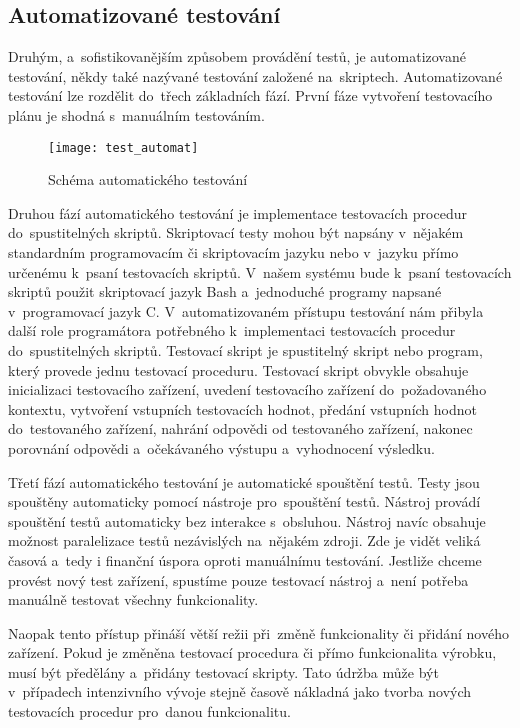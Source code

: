 \subsection{Automatizované testování}
Druhým, a~sofistikovanějším způsobem provádění testů, je automatizované testování, někdy také nazývané testování založené na~skriptech. Automatizované testování lze rozdělit do~třech základních fází. První fáze vytvoření testovacího plánu je shodná s~manuálním testováním.

\begin{figure}[h]
  \centering
  \texttt{[image: test\_automat]}
  \caption{Schéma automatického testování \cite{MBT} }
  \label{fig:test_automat}
\end{figure}

Druhou fází automatického testování je implementace testovacích procedur do~spustitelných skriptů. Skriptovací testy mohou být napsány v~nějakém standardním programovacím či skriptovacím jazyku nebo v~jazyku přímo určenému k~psaní testovacích skriptů. V~našem systému bude k~psaní testovacích skriptů použit skriptovací jazyk Bash a~jednoduché programy napsané v~programovací jazyk C. V~automatizovaném přístupu testování nám přibyla další role programátora potřebného k~implementaci testovacích procedur do~spustitelných skriptů. Testovací skript je spustitelný skript nebo program, který provede jednu testovací proceduru. Testovací skript obvykle obsahuje inicializaci testovacího zařízení, uvedení testovacího zařízení do~požadovaného kontextu, vytvoření vstupních testovacích hodnot, předání vstupních hodnot do~testovaného zařízení, nahrání odpovědi od testovaného zařízení, nakonec porovnání odpovědi a~očekávaného výstupu a~vyhodnocení výsledku.

Třetí fází automatického testování je automatické spouštění testů. Testy jsou spouštěny automaticky pomocí nástroje pro~spouštění testů. Nástroj provádí spouštění testů automaticky bez interakce s~obsluhou. Nástroj navíc obsahuje možnost paralelizace testů nezávislých na~nějakém zdroji. Zde je vidět veliká časová a~tedy i finanční úspora oproti manuálnímu testování. Jestliže chceme provést nový test zařízení, spustíme pouze testovací nástroj a~není potřeba manuálně testovat všechny funkcionality.

Naopak tento přístup přináší větší režii při~změně funkcionality či přidání nového zařízení. Pokud je změněna testovací procedura či přímo funkcionalita výrobku, musí být předělány a~přidány testovací skripty. Tato údržba může být v~případech intenzivního vývoje stejně časově nákladná jako tvorba nových testovacích procedur pro~danou funkcionalitu.

